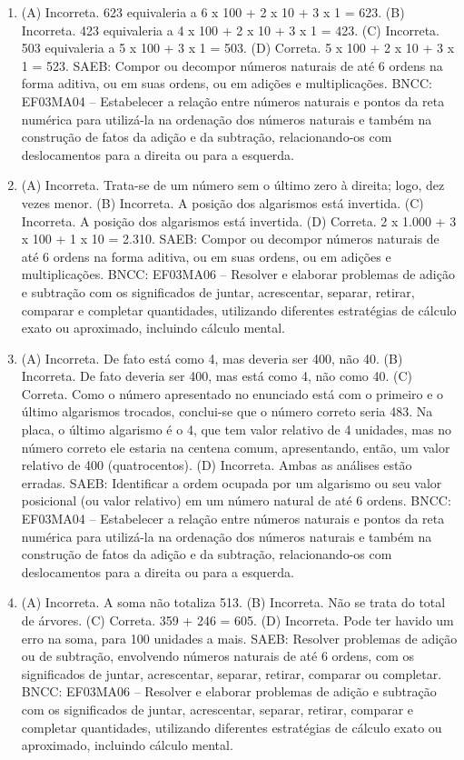 
\begin{enumerate}
\item
(A) Incorreta. 623 equivaleria a 6 x 100 + 2 x 10 + 3 x 1 = 623.
(B) Incorreta. 423 equivaleria a 4 x 100 + 2 x 10 + 3 x 1 = 423.
(C) Incorreta. 503 equivaleria a 5 x 100 + 3 x 1 = 503.
(D) Correta. 5 x 100 + 2 x 10 + 3 x 1 = 523.
SAEB: Compor ou decompor números naturais de até 6 ordens na forma aditiva, ou em suas ordens, ou em adições e multiplicações.
BNCC: EF03MA04 -- Estabelecer a relação entre números naturais e pontos da reta numérica para
utilizá-la na ordenação dos números naturais e também na construção de fatos da adição e da
subtração, relacionando-os com deslocamentos para a direita ou para a esquerda.

\item
(A) Incorreta. Trata-se de um número sem o último zero à direita; logo, dez vezes menor.
(B) Incorreta. A posição dos algarismos está invertida.
(C) Incorreta. A posição dos algarismos está invertida.
(D) Correta. 2 x 1.000 + 3 x 100 + 1 x 10 = 2.310.
SAEB: Compor ou decompor números naturais de até 6 ordens na
forma aditiva, ou em suas ordens, ou em adições e multiplicações.
BNCC: EF03MA06 – Resolver e elaborar problemas de adição e subtração com os significados de
juntar, acrescentar, separar, retirar, comparar e completar quantidades, utilizando diferentes
estratégias de cálculo exato ou aproximado, incluindo cálculo mental.

\item
(A) Incorreta. De fato está como 4, mas deveria ser 400, não 40.
(B) Incorreta. De fato deveria ser 400, mas está como 4, não como 40.
(C) Correta. Como o número apresentado no enunciado está com o primeiro e o último
algarismos trocados, conclui-se que o número correto seria 483. Na placa,
o último algarismo é o 4, que tem valor relativo de 4 unidades, mas no
número correto ele estaria na centena comum, apresentando, então, um valor
relativo de 400 (quatrocentos).
(D) Incorreta. Ambas as análises estão erradas.
SAEB: Identificar a ordem ocupada por um algarismo ou seu
valor posicional (ou valor relativo) em um número natural de até 6
ordens.
BNCC: EF03MA04 -- Estabelecer a relação entre números naturais e pontos da reta numérica para
utilizá-la na ordenação dos números naturais e também na construção de fatos da adição e da
subtração, relacionando-os com deslocamentos para a direita ou para a esquerda.

\item
(A) Incorreta. A soma não totaliza 513.
(B) Incorreta. Não se trata do total de árvores.
(C) Correta. 359 + 246 = 605.
(D) Incorreta. Pode ter havido um erro na soma, para 100 unidades a mais.
SAEB: Resolver problemas de adição ou de subtração,
envolvendo números naturais de até 6 ordens, com os significados de
juntar, acrescentar, separar, retirar, comparar ou completar.
BNCC: EF03MA06 – Resolver e elaborar problemas de adição e subtração com os significados de
juntar, acrescentar, separar, retirar, comparar e completar quantidades, utilizando diferentes
estratégias de cálculo exato ou aproximado, incluindo cálculo mental.


\end{enumerate}
